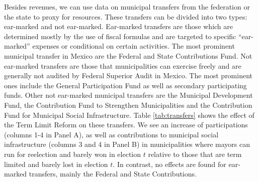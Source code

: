         

 Besides revenues, we can use data on municipal transfers from the federation or the state to proxy for resources. These transfers can be divided into two types: ear-marked and not ear-marked. Ear-marked transfers are those which are determined mostly by the use of fiscal formulas and are targeted to specific ``ear-marked'' expenses or conditional on certain activities. The most prominent municipal transfer in Mexico are the Federal and State Contributions Fund. Not ear-marked transfers are those that municipalities can exercise freely and are generally not audited by Federal Superior Audit in Mexico. The most prominent ones include the General Participation Fund as well as secondary participating funds. Other not ear-marked municipal transfers are the Municipal Development Fund, the Contribution Fund to Strengthen Municipalities and the Contribution Fund for Municipal Social Infrastructure. Table \ref{tab:transfers} shows the effect of the Term Limit Reform on these transfers. We see an increase of participations (columns 1-4 in Panel A), as well as contributions to municipal social infrastructure (columns 3 and 4 in Panel B)  in municipalities where mayors can run for reelection and barely won in election $t$ relative to those that are term limited and barely lost in election $t$. In contrast, no effects are found for ear-marked transfers, mainly the Federal and State Contributions. 
   
